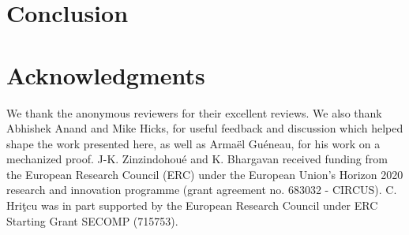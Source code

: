 \documentclass[acmsmall,review,anonymous]{acmart}\settopmatter{printfolios=true}
\begin{document}




\section{Conclusion}


\section*{Acknowledgments}
We thank the anonymous reviewers for their excellent reviews. We also thank
Abhishek Anand and Mike Hicks, for useful feedback and discussion which helped
shape the work presented here, as well as Armaël Guéneau, for his work on a
mechanized proof.
%
J-K. Zinzindohou\'e and K. Bhargavan received funding from the
European Research Council (ERC) under the European Union’s Horizon
2020 research and innovation programme (grant agreement no. 683032 - CIRCUS).
%
C. Hri\c{t}cu was in part supported by the European Research Council
under ERC Starting Grant SECOMP (715753).


\iflong
\newpage
\appendix


\end{document}
